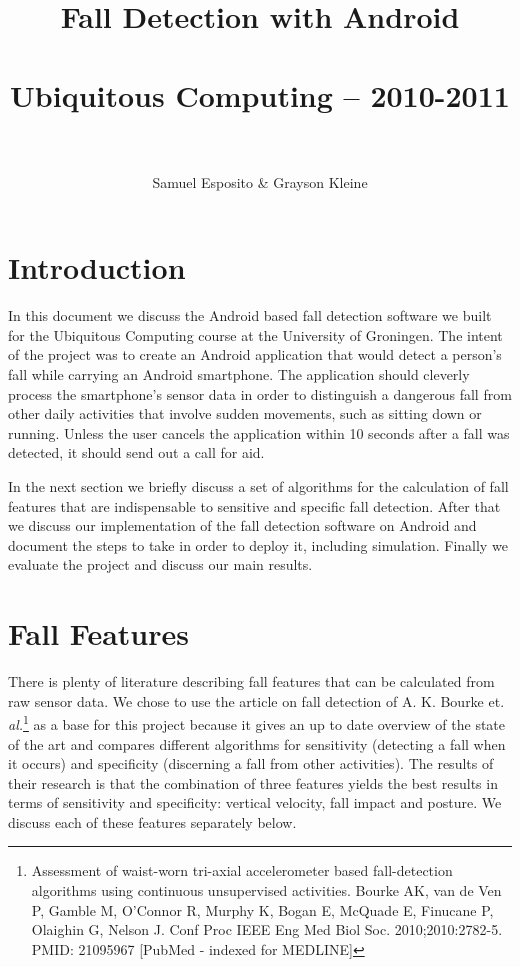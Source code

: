 \documentclass[a4paper, 10pt]{article}
\title{Fall Detection with Android\\~\\Ubiquitous Computing -- 2010-2011\\~}
\author{Samuel Esposito \& Grayson Kleine}
\date{}
\begin{document}
\ifpdf
{}
\else
{}
\fi

\maketitle

\section{Introduction}
In this document we discuss the Android based fall detection software we built for the Ubiquitous Computing course at the University of Groningen. The intent of the project was to create an Android application that would detect a person's fall while carrying an Android smartphone. The application should cleverly process the smartphone's sensor data in order to distinguish a dangerous fall from other daily activities that involve sudden movements, such as sitting down or running. Unless the user cancels the application within 10 seconds after a fall was detected, it should send out a call for aid.

In the next section we briefly discuss a set of algorithms for the calculation of fall features that are indispensable to sensitive and specific fall detection. After that we discuss our implementation of the fall detection software on Android and document the steps to take in order to deploy it, including simulation. Finally we evaluate the project and discuss our main results.

\section{Fall Features}
There is plenty of literature describing fall features that can be calculated from raw sensor data. We chose to use the article on fall detection of A. K. Bourke et. \textit{al.}\footnote{Assessment of waist-worn tri-axial accelerometer based fall-detection algorithms using continuous unsupervised activities. Bourke AK, van de Ven P, Gamble M, O'Connor R, Murphy K, Bogan E, McQuade E, Finucane P, Olaighin G, Nelson J. Conf Proc IEEE Eng Med Biol Soc. 2010;2010:2782-5. PMID: 21095967 [PubMed - indexed for MEDLINE]} as a base for this project because it gives an up to date overview of the state of the art and compares different algorithms for sensitivity (detecting a fall when it occurs) and specificity (discerning a fall from other activities). The results of their research is that the combination of three features yields the best results in terms of sensitivity and specificity: vertical velocity, fall impact and posture. We discuss each of these features separately below.
\end{document}
